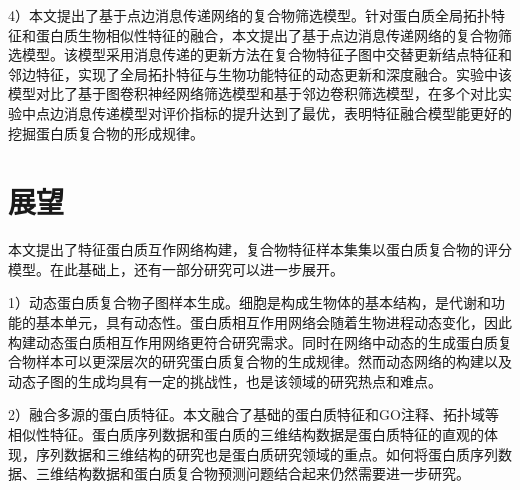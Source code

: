 4）本文提出了基于点边消息传递网络的复合物筛选模型。针对蛋白质全局拓扑特征和蛋白质生物相似性特征的融合，本文提出了基于点边消息传递网络的复合物筛选模型。该模型采用消息传递的更新方法在复合物特征子图中交替更新结点特征和邻边特征，实现了全局拓扑特征与生物功能特征的动态更新和深度融合。实验中该模型对比了基于图卷积神经网络筛选模型和基于邻边卷积筛选模型，在多个对比实验中点边消息传递模型对评价指标的提升达到了最优，表明特征融合模型能更好的挖掘蛋白质复合物的形成规律。


\section{展望}
\label{section:forward}

本文提出了特征蛋白质互作网络构建，复合物特征样本集集以蛋白质复合物的评分模型。在此基础上，还有一部分研究可以进一步展开。

1）动态蛋白质复合物子图样本生成。细胞是构成生物体的基本结构，是代谢和功能的基本单元，具有动态性。蛋白质相互作用网络会随着生物进程动态变化，因此构建动态蛋白质相互作用网络更符合研究需求。同时在网络中动态的生成蛋白质复合物样本可以更深层次的研究蛋白质复合物的生成规律。然而动态网络的构建以及动态子图的生成均具有一定的挑战性，也是该领域的研究热点和难点。

2）融合多源的蛋白质特征。本文融合了基础的蛋白质特征和GO注释、拓扑域等相似性特征。蛋白质序列数据和蛋白质的三维结构数据是蛋白质特征的直观的体现，序列数据和三维结构的研究也是蛋白质研究领域的重点。如何将蛋白质序列数据、三维结构数据和蛋白质复合物预测问题结合起来仍然需要进一步研究。

